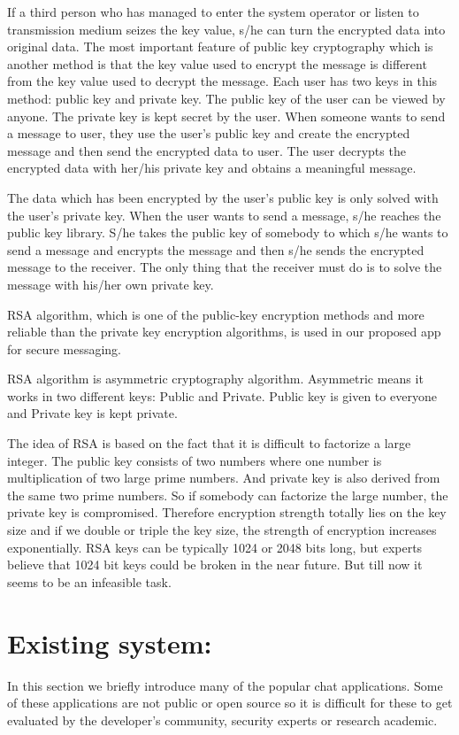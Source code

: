 If a third person who has managed to enter the system operator or listen to transmission medium
seizes the  key value,  s/he can turn  the  encrypted data into  original data.  The most  important
feature of public key cryptography which is another method is that the key value used to encrypt
the message is different from the key value used to decrypt the message. Each user has two keys
in this method: public key and private key. The public key of the user can be viewed by anyone.
The private key is kept secret by the user. When someone wants to send a message to user, they
use the user's public key and create the encrypted message and then send the encrypted data to
user. The user  decrypts the  encrypted data with  her/his private  key  and obtains  a meaningful
message.

The data which has been encrypted by the user’s public key is only solved with the user’s private key. When the user wants to send a message, s/he reaches the public key library. S/he takes
the public key of somebody to which s/he wants to send a message and encrypts the message and
then s/he sends the encrypted message to the receiver. The only thing that the receiver must do is
to solve the message with his/her own private key.

RSA algorithm, which is one of the public-key encryption methods and more reliable than the
private key encryption algorithms, is used in our proposed app for secure messaging.\cite{paley2}

RSA algorithm is asymmetric cryptography algorithm. Asymmetric means it works in two different keys: Public and Private. Public key is given to everyone and Private key is kept private.

The idea of RSA is based on the fact that it is difficult to factorize a large integer. The public key consists of two numbers where one number is multiplication of two large prime numbers. And private key is also derived from the same two prime numbers. So if somebody can factorize the large number, the private key is compromised. Therefore encryption strength totally lies on the key size and if we double or triple the key size, the strength of encryption increases exponentially. RSA keys can be typically 1024 or 2048 bits long, but experts believe that 1024 bit keys could be broken in the near future. But till now it seems to be an infeasible task.\cite{ram}

\section{Existing system:}
In this section we briefly introduce many of the popular chat applications. Some of these applications are not public or open source so it is difficult for these to get evaluated by the developer’s community, security experts or research academic.

